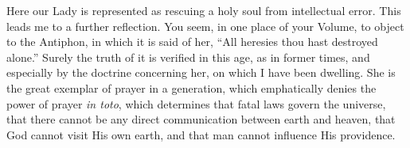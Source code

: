 Here our Lady is represented as rescuing a holy soul from
intellectual error. This leads me to a further reflection. You seem, in
one place of your Volume, to object to the Antiphon, in which it is said
of her, ``All heresies thou hast destroyed alone.'' Surely the
truth of it is verified in this age, as in former times, and especially
by the doctrine concerning her, on which I have been dwelling. She
is the great exemplar of prayer in a generation, which emphatically
denies the power of prayer \emph{in toto}, which determines that fatal
laws govern the universe, that there cannot be any direct communication
between earth and heaven, that God cannot visit His own earth, and that
man cannot influence His providence.


